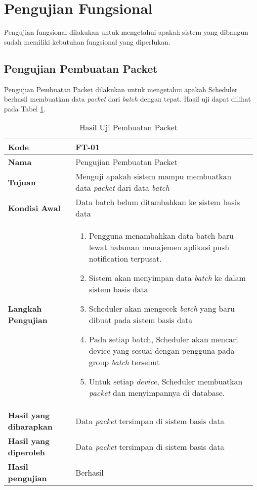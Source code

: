 \section{Pengujian Fungsional}
\par Pengujian fungsional dilakukan untuk mengetahui apakah sistem yang dibangun sudah memiliki kebutuhan fungsional yang diperlukan.

\subsection{Pengujian Pembuatan Packet}
\par Pengujian Pembuatan Packet dilakukan untuk mengetahui apakah Scheduler berhasil membuatkan data \textit{packet} dari \textit{batch} dengan tepat. Hasil uji dapat dilihat pada Tabel \ref{t:uji_pembuatan_packet}.
\begin{longtable}{|p{3cm}|p{6.5cm}|}
	\caption{Hasil Uji Pembuatan Packet} \label{t:uji_pembuatan_packet} \\ \hline
	\textbf{Kode} & FT-01 \\ \hline
	\textbf{Nama} & Pengujian Pembuatan Packet \\ \hline
	\textbf{Tujuan} & Menguji apakah sistem mampu membuatkan data \textit{packet} dari data \textit{batch} \\ \hline
	\textbf{Kondisi Awal} & Data batch belum ditambahkan ke sistem basis data \\ \hline
	\textbf{Langkah Pengujian} &  
	\begin{enumerate}
		\item Pengguna menambahkan data batch baru lewat halaman manajemen aplikasi push notification terpusat.
		\item Sistem akan menyimpan data \textit{batch} ke dalam sistem basis data
		\item Scheduler akan mengecek \textit{batch} yang baru dibuat pada sistem basis data
		\item Pada setiap batch, Scheduler akan mencari device yang sesuai dengan pengguna pada group \textit{batch} tersebut
		\item Untuk setiap \textit{device}, Scheduler membuatkan \textit{packet} dan menyimpannya di database.
	\end{enumerate} \\ \hline
	\textbf{Hasil yang diharapkan} & Data \textit{packet} tersimpan di sistem basis data \\ \hline
	\textbf{Hasil yang diperoleh} & Data \textit{packet} tersimpan di sistem basis data \\ \hline
	\textbf{Hasil pengujian} & Berhasil \\ \hline
\end{longtable}

